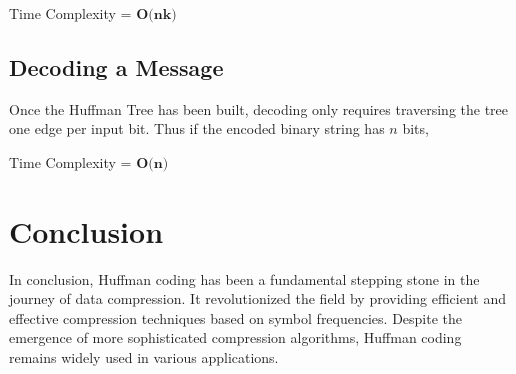 \documentclass[18pt]{article}
\begin{document}
Time Complexity = $\textbf{O(nk)}$

\subsection{Decoding a Message}

Once the Huffman Tree has been built, decoding only requires traversing the tree one edge per input bit. Thus if the encoded binary string has $n$ bits,

Time Complexity = $\textbf{O(n)}$


\newpage


\section{Conclusion}

In conclusion, Huffman coding has been a fundamental stepping
stone in the journey of data compression. It revolutionized the field by providing efficient and effective
compression techniques based on symbol frequencies. Despite the emergence of more sophisticated compression
algorithms, Huffman coding remains widely used in various
applications.
\end{document}
